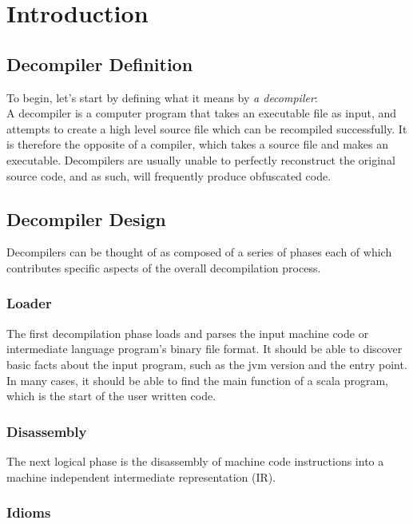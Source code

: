 \chapter{Introduction}

\section{Decompiler Definition}

To begin, let's start by defining what it means by \emph{a decompiler}: \\ 

A decompiler is a computer program that takes an executable file as input, and attempts to create a high level source file which can be recompiled successfully. It is therefore the opposite of a compiler, which takes a source file and makes an executable. Decompilers are usually unable to perfectly reconstruct the original source code, and as such, will frequently produce obfuscated code.

\section{Decompiler Design}

Decompilers can be thought of as composed of a series of phases each of which contributes specific aspects of the overall decompilation process.

\subsection{Loader}

The first decompilation phase loads and parses the input machine code or intermediate language program's binary file format. It should be able to discover basic facts about the input program, such as the jvm version and the entry point. In many cases, it should be able to find the main function of a scala program, which is the start of the user written code.

\subsection{Disassembly}

The next logical phase is the disassembly of machine code instructions into a machine independent intermediate representation (IR).

\subsection{Idioms}

